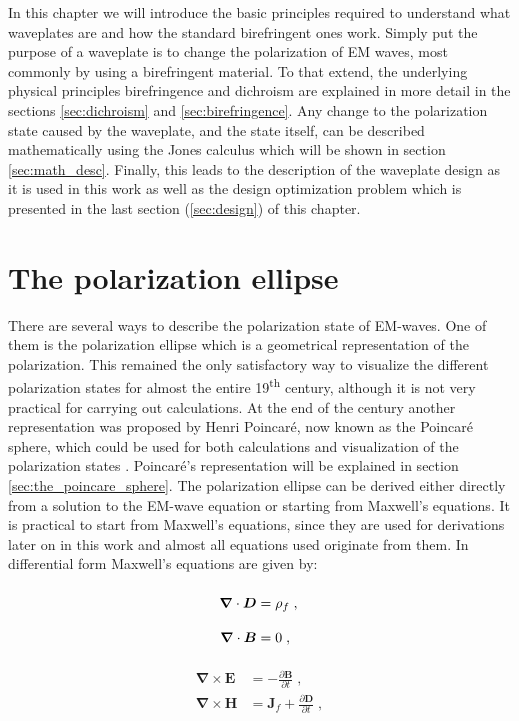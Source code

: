 In this chapter we will introduce the basic principles required to understand what waveplates are and how the standard birefringent ones work. Simply put the purpose of a waveplate is to change the polarization of EM waves, most commonly by using a birefringent material. To that extend, the underlying physical principles birefringence and dichroism are explained in more detail in the sections \ref{sec:dichroism} and \ref{sec:birefringence}. Any change to the polarization state caused by the waveplate, and the state itself, can be described mathematically using the Jones calculus which will be shown in section \ref{sec:math_desc}. Finally, this leads to the description of the waveplate design as it is used in this work as well as the design optimization problem which is presented in the last section (\ref{sec:design}) of this chapter.

\section{The polarization ellipse}
\label{sec:polellipse}
There are several ways to describe the polarization state of EM-waves. One of them is the polarization ellipse which is a geometrical representation of the polarization. This remained the only satisfactory way to visualize the different polarization states for almost the entire 19\textsuperscript{th} century, although it is not very practical for carrying out calculations. At the end of the century another representation was proposed by Henri Poincaré, now known as the Poincaré sphere, which could be used for both calculations and visualization of the polarization states \cite{Collett2008VisualizationSphere}. Poincaré's representation will be explained in section \ref{sec:the_poincare_sphere}. The polarization ellipse can be derived either directly from a solution to the EM-wave equation or starting from Maxwell's equations.  It is practical to start from Maxwell's equations, since they are used for derivations later on in this work and almost all equations used originate from them. In differential form Maxwell's equations are given by: 
\par
\noindent\begin{minipage}{.5\linewidth}
\begin{align}
    \bm{\nabla}\cdot\bm{D} &=\rho_{f}\;,\label{eq:maxwell1}
    \vphantom{\frac{\partial\bm{B}}{\partial t}}\\
    \bm{\nabla}\cdot\bm{B} &=0\;,\vphantom{\frac{\partial\bm{B}}{\partial t}}\label{eq:maxwell2}
\end{align}
\end{minipage}%
\begin{minipage}{.5\linewidth}
\begin{align}
    \bm{\nabla}\times\bm{E} &=-\frac{\partial\bm{B}}{\partial t}\;,\label{eq:maxwell3}
    \\
    \bm{\nabla}\times\bm{H} &=\bm{J}_f
    +\frac{\partial\bm{D}}{\partial t}\;,\label{eq:maxwell4}
\end{align}
\end{minipage}
\newline

